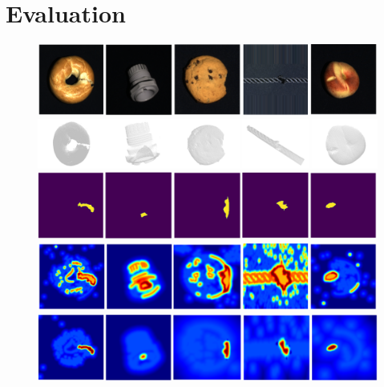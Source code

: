 \section*{Evaluation}
\label{sec:evaluation}

\begin{figure}[ht]
\centering
\DIFdelbeginFL %
\DIFdelendFL \DIFaddbeginFL \includegraphics[width=0.9\linewidth]{figs/result_rgb}
\includegraphics[width=0.9\linewidth]{figs/result_pc}
\includegraphics[width=0.9\linewidth]{figs/result_gt}
\includegraphics[width=0.9\linewidth]{figs/result_baseline}
\includegraphics[width=0.9\linewidth]{figs/result_ours}
\vspace{-0.2cm}

\begin{flushleft}
 \end{flushleft}


\end{figure}
